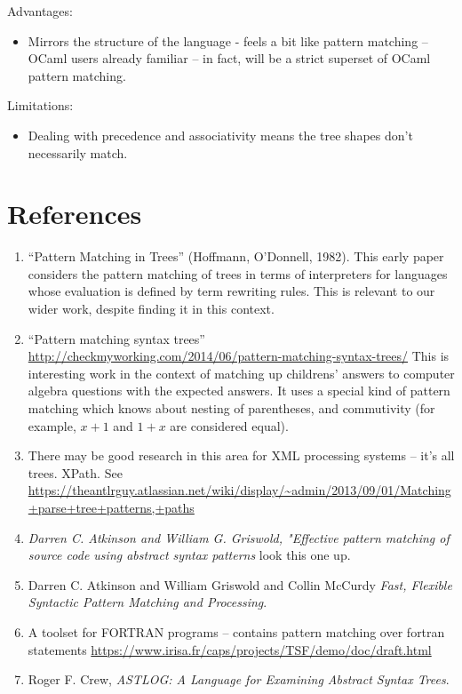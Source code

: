 \documentclass[10pt]{article}
\begin{document}
Advantages:
\begin{itemize}
\item Mirrors the structure of the language - feels a bit like pattern matching -- OCaml users already familiar -- in fact, will be a strict superset of OCaml pattern matching.
\end{itemize}

\noindent Limitations:
\begin{itemize}
\item Dealing with precedence and associativity means the tree shapes don't necessarily match.
\end{itemize}

\section{References}

\begin{enumerate}
\item ``Pattern Matching in Trees'' (Hoffmann, O'Donnell, 1982). This early paper considers the pattern matching of trees in terms of interpreters for languages whose evaluation is defined by term rewriting rules. This is relevant to our wider work, despite finding it in this context.
\item ``Pattern matching syntax trees''\\ \url{http://checkmyworking.com/2014/06/pattern-matching-syntax-trees/} This is interesting work in the context of matching up childrens' answers to computer algebra questions with the expected answers. It uses a special kind of pattern matching which knows about nesting of parentheses, and commutivity (for example, $x + 1$ and $1 + x$ are considered equal).
\item There may be good research in this area for XML processing systems -- it's all trees. XPath. See \url{https://theantlrguy.atlassian.net/wiki/display/~admin/2013/09/01/Matching+parse+tree+patterns,+paths}
\item \textit{Darren C. Atkinson and William G. Griswold, "Effective pattern matching of source code using abstract syntax patterns} look this one up. 
\item Darren C. Atkinson and William Griswold and Collin McCurdy \textit{Fast, Flexible Syntactic Pattern Matching and Processing}.
\item A toolset for FORTRAN programs -- contains pattern matching over fortran statements \url{https://www.irisa.fr/caps/projects/TSF/demo/doc/draft.html}
\item Roger F. Crew, \textit{ASTLOG: A Language for Examining Abstract Syntax Trees}.
\end{enumerate}
\end{document}
